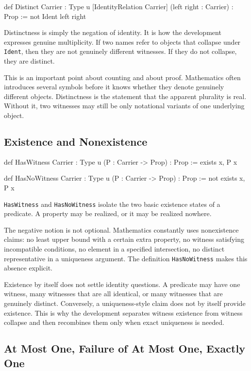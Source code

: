 \documentclass[11pt]{article}
\newcommand{\leaninline}[1]{\texttt{#1}}
\begin{document}
\begin{leanblock}
def Distinct {Carrier : Type u} [IdentityRelation Carrier]
    (left right : Carrier) : Prop :=
  not Ident left right
\end{leanblock}

Distinctness is simply the negation of identity. It is how the development expresses genuine multiplicity. If two names refer to objects that collapse under \leaninline{Ident}, then they are not genuinely different witnesses. If they do not collapse, they are distinct.

This is an important point about counting and about proof. Mathematics often introduces several symbols before it knows whether they denote genuinely different objects. Distinctness is the statement that the apparent plurality is real. Without it, two witnesses may still be only notational variants of one underlying object.

\subsection{Existence and Nonexistence}

\begin{leanblock}
def HasWitness {Carrier : Type u} (P : Carrier -> Prop) : Prop :=
  exists x, P x

def HasNoWitness {Carrier : Type u} (P : Carrier -> Prop) : Prop :=
  not exists x, P x
\end{leanblock}

\leaninline{HasWitness} and \leaninline{HasNoWitness} isolate the two basic existence states of a predicate. A property may be realized, or it may be realized nowhere.

The negative notion is not optional. Mathematics constantly uses nonexistence claims: no least upper bound with a certain extra property, no witness satisfying incompatible conditions, no element in a specified intersection, no distinct representative in a uniqueness argument. The definition \leaninline{HasNoWitness} makes this absence explicit.

Existence by itself does not settle identity questions. A predicate may have one witness, many witnesses that are all identical, or many witnesses that are genuinely distinct. Conversely, a uniqueness-style claim does not by itself provide existence. This is why the development separates witness existence from witness collapse and then recombines them only when exact uniqueness is needed.

\subsection{At Most One, Failure of At Most One, Exactly One}
\end{document}
